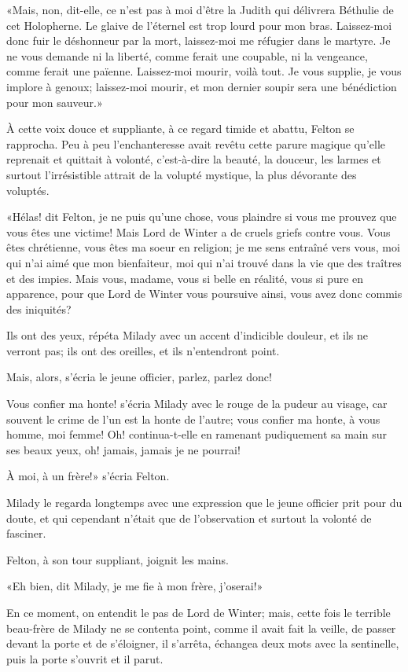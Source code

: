 «Mais, non, dit-elle, ce n'est pas à moi d'être la Judith qui délivrera Béthulie de cet Holopherne. Le glaive de l'éternel est trop lourd pour mon bras. Laissez-moi donc fuir le déshonneur par la mort, laissez-moi me réfugier dans le martyre. Je ne vous demande ni la liberté, comme ferait une coupable, ni la vengeance, comme ferait une païenne. Laissez-moi mourir, voilà tout. Je vous supplie, je vous implore à genoux; laissez-moi mourir, et mon dernier soupir sera une bénédiction pour mon sauveur.» 

À cette voix douce et suppliante, à ce regard timide et abattu, Felton se rapprocha. Peu à peu l'enchanteresse avait revêtu cette parure magique qu'elle reprenait et quittait à volonté, c'est-à-dire la beauté, la douceur, les larmes et surtout l'irrésistible attrait de la volupté mystique, la plus dévorante des voluptés. 

«Hélas! dit Felton, je ne puis qu'une chose, vous plaindre si vous me prouvez que vous êtes une victime! Mais Lord de Winter a de cruels griefs contre vous. Vous êtes chrétienne, vous êtes ma soeur en religion; je me sens entraîné vers vous, moi qui n'ai aimé que mon bienfaiteur, moi qui n'ai trouvé dans la vie que des traîtres et des impies. Mais vous, madame, vous si belle en réalité, vous si pure en apparence, pour que Lord de Winter vous poursuive ainsi, vous avez donc commis des iniquités? 

\speak  Ils ont des yeux, répéta Milady avec un accent d'indicible douleur, et ils ne verront pas; ils ont des oreilles, et ils n'entendront point. 

\speak  Mais, alors, s'écria le jeune officier, parlez, parlez donc! 

\speak  Vous confier ma honte! s'écria Milady avec le rouge de la pudeur au visage, car souvent le crime de l'un est la honte de l'autre; vous confier ma honte, à vous homme, moi femme! Oh! continua-t-elle en ramenant pudiquement sa main sur ses beaux yeux, oh! jamais, jamais je ne pourrai! 

\speak  À moi, à un frère!» s'écria Felton. 

Milady le regarda longtemps avec une expression que le jeune officier prit pour du doute, et qui cependant n'était que de l'observation et surtout la volonté de fasciner. 

Felton, à son tour suppliant, joignit les mains. 

«Eh bien, dit Milady, je me fie à mon frère, j'oserai!» 

En ce moment, on entendit le pas de Lord de Winter; mais, cette fois le terrible beau-frère de Milady ne se contenta point, comme il avait fait la veille, de passer devant la porte et de s'éloigner, il s'arrêta, échangea deux mots avec la sentinelle, puis la porte s'ouvrit et il parut. 

